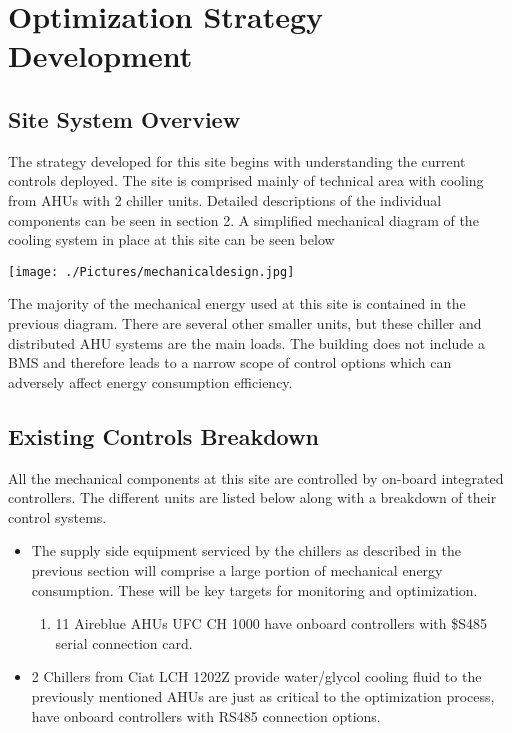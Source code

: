 \section{Optimization Strategy Development}

\subsection{Site System Overview}

The strategy developed for this site begins with understanding the current controls deployed. The site is comprised mainly of technical area with cooling from AHUs with 2 chiller units. Detailed descriptions of the individual components can be seen in section 2. A simplified mechanical diagram of the cooling system in place at this site can be seen below

\begin{center}
	\centering
	\texttt{[image: ./Pictures/mechanicaldesign.jpg]}
\end{center}

The majority of the mechanical energy used at this site is contained in the previous diagram. There are several other smaller units, but these chiller and distributed AHU systems are the main loads. The building does not include a BMS and therefore leads to a narrow scope of control options which can adversely affect energy consumption efficiency. 

\subsection{Existing Controls Breakdown}

All the mechanical components at this site are controlled by on-board integrated controllers. The different units are listed below along with a breakdown of their control systems.

\begin{itemize}
  \item  The supply side equipment serviced by the chillers as described in the previous section will comprise a large portion of mechanical energy consumption. These will be key targets for monitoring and optimization.
  \begin{enumerate}[o]
     \item  11 Aireblue AHUs UFC CH 1000 have onboard controllers with \$S485 serial connection card.
     \end{enumerate}
  \item 	2 Chillers from Ciat LCH 1202Z provide water/glycol cooling fluid to the previously mentioned AHUs are just as critical to the optimization process, have onboard controllers with RS485 connection options.
  \end{itemize}

